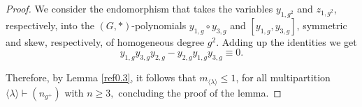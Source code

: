 \documentclass[10pt,a4paper]{amsart}
\begin{document}
\begin{proof}
     We consider the endomorphism that takes the variables $y_{1,g^2}$ and $z_{1,g^2}$, respectively, into the $(G,*)$-polynomials $y_{1,g}\circ y_{3,g}$ and $[y_{1,g}, y_{3,g}]$, symmetric and skew, respectively, of homogeneous degree $g^2$. Adding up the identities we get 
$$y_{1,g}y_{3,g}y_{2,g} - y_{2,g}y_{1,g}y_{3,g}\equiv 0.$$

 Therefore, by Lemma \ref{ref0.3}, it follows that $m_{\langle \lambda \rangle}\le 1$, for all multipartition $\langle \lambda \rangle \vdash (n_{g^+})$ with $n\geq 3,$ concluding the proof of the lemma.
    \end{proof}
\end{document}
